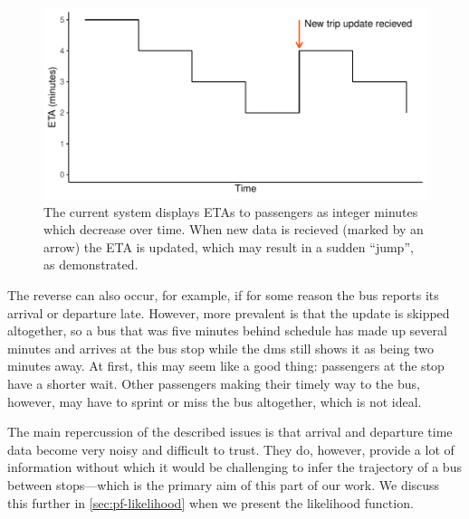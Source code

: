 \begin{knitrout}\small
{}\color{fgcolor}\begin{figure}

{\centering \includegraphics[width=.8\textwidth]{figure/tu_eta_jump-1} 

}

\caption[Demonstration of how ETAs are percieved by passengers under the current system]{The current system displays ETAs to passengers as integer minutes which decrease over time. When new data is recieved (marked by an arrow) the ETA is updated, which may result in a sudden ``jump'', as demonstrated.}\label{fig:tu_eta_jump}
\end{figure}


\end{knitrout}


The reverse can also occur, for example, if for some reason the bus reports its arrival or departure late. However, more prevalent is that the update is skipped altogether, so a bus that was five minutes behind schedule has made up several minutes and arrives at the bus stop while the \gls{dms} still shows it as being two minutes away. At first, this may seem like a good thing: passengers at the stop have a shorter wait. Other passengers making their timely way to the bus, however, may have to sprint or miss the bus altogether, which is not ideal.


The main repercussion of the described issues is that arrival and departure time data become very noisy and difficult to trust. They do, however, provide a lot of information without which it would be challenging to infer the trajectory of a bus between stops---which is the primary aim of this part of our work. We discuss this further in \cref{sec:pf-likelihood} when we present the likelihood function.
